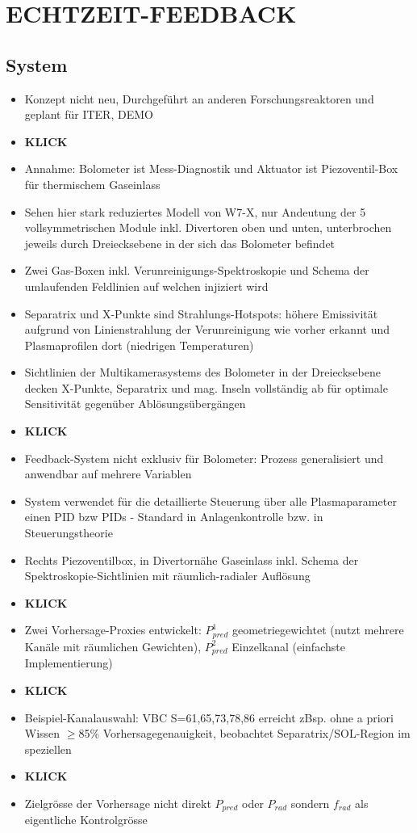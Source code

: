 \documentclass[11pt,a4paper]{article}
\begin{document}
\section{ECHTZEIT-FEEDBACK}

\subsection{System}

\begin{itemize}
\item Konzept nicht neu, Durchgeführt an anderen Forschungsreaktoren und geplant für ITER, DEMO
\item \textbf{KLICK}
\item Annahme: Bolometer ist Mess-Diagnostik und Aktuator ist Piezoventil-Box für thermischem Gaseinlass
\item Sehen hier stark reduziertes Modell von W7-X, nur Andeutung der 5 vollsymmetrischen Module inkl. Divertoren oben und unten, unterbrochen jeweils durch Dreiecksebene in der sich das Bolometer befindet
\item Zwei Gas-Boxen inkl. Verunreinigungs-Spektroskopie und Schema der  umlaufenden Feldlinien auf welchen injiziert wird
\item Separatrix und X-Punkte sind Strahlungs-Hotspots: höhere Emissivität aufgrund von Linienstrahlung der Verunreinigung wie vorher erkannt und Plasmaprofilen dort (niedrigen Temperaturen)
\item Sichtlinien der Multikamerasystems des Bolometer in der Dreiecksebene decken X-Punkte, Separatrix und mag. Inseln vollständig ab für optimale Sensitivität gegenüber Ablösungsübergängen
\item \textbf{KLICK}
\item Feedback-System nicht exklusiv für Bolometer: Prozess generalisiert und anwendbar auf mehrere Variablen
\item System verwendet für die detaillierte Steuerung über alle Plasmaparameter einen PID bzw PIDs - Standard in Anlagenkontrolle bzw. in Steuerungstheorie
\item Rechts Piezoventilbox, in Divertornähe Gaseinlass inkl. Schema der Spektroskopie-Sichtlinien mit räumlich-radialer Auflösung
\item \textbf{KLICK}
\item Zwei Vorhersage-Proxies entwickelt: $P_{pred}^{1}$ geometriegewichtet (nutzt mehrere Kanäle mit räumlichen Gewichten), $P_{pred}^{2} $ Einzelkanal (einfachste Implementierung)
\item \textbf{KLICK}
\item Beispiel-Kanalauswahl: VBC S={61,65,73,78,86} erreicht zBsp. ohne a priori Wissen $\geq$85\% Vorhersagegenauigkeit, beobachtet Separatrix/SOL-Region im speziellen
\item \textbf{KLICK}
\item Zielgrösse der Vorhersage nicht direkt $P_{pred}$ oder $P_{rad}$ sondern $f_{rad}$ als eigentliche Kontrolgrösse
\end{itemize}
\end{document}
